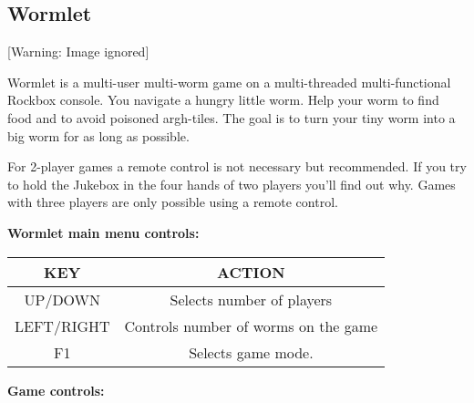 \subsection{Wormlet}
  [Warning: Image ignored] %

Wormlet is a multi{}-user multi{}-worm game on a multi{}-threaded
multi{}-functional Rockbox console. You navigate a hungry little worm.
Help your worm to find food and to avoid poisoned argh{}-tiles. The
goal is to turn your tiny worm into a big worm for as long as possible.

For 2{}-player games a remote control is not necessary but recommended.
If you try to hold the Jukebox in the four hands of two players
you'll find out why. Games with three players are only
possible using a remote control.

{\bfseries
Wormlet main menu controls:}

\begin{table}[h!]
\begin{center}
\begin{tabular}{|c|c|}
\hline
KEY & ACTION \\\hline
UP/DOWN & Selects number of players \\\hline
LEFT/RIGHT & Controls number of worms on the game \\\hline
F1 & Selects game mode. \\\hline
\end{tabular}
\end{center}
\end{table}

{\bfseries
Game controls:}

